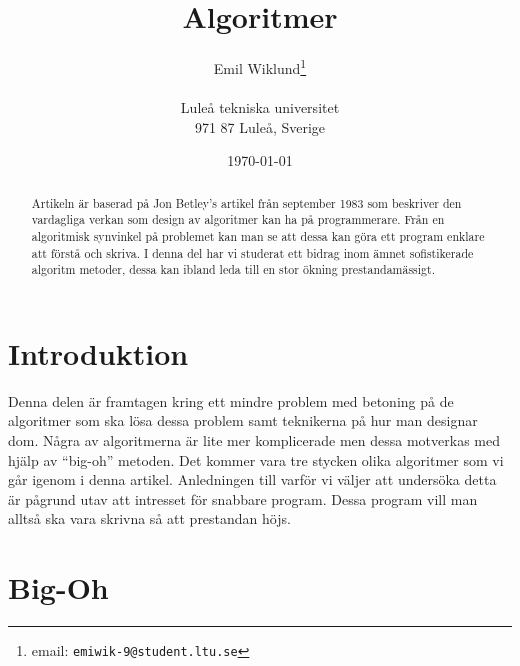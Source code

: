 \documentclass[a4paper,12pt]{article}
\title{Algoritmer}
\author{Emil Wiklund\thanks{email: \texttt{emiwik-9@student.ltu.se}}\\  
        ~ \\
        Luleå tekniska universitet \\ 
        971 87 Luleå, Sverige}
\date{\today}
\begin{document}
\linenumbers


\maketitle


\begin{abstract}
%
Artikeln är baserad på Jon Betley's artikel från september 1983 som beskriver 
den vardagliga verkan som design av algoritmer kan ha på programmerare. 
Från en algoritmisk synvinkel på problemet kan man se att dessa kan göra 
ett program enklare att förstå och skriva. I denna del har vi studerat ett 
bidrag inom ämnet sofistikerade algoritm metoder, dessa kan ibland leda till
en stor ökning prestandamässigt. 
%
\end{abstract}


\section{Introduktion}
\label{sec:introduktion}


Denna delen är framtagen kring ett mindre
problem med betoning på de algoritmer som ska lösa dessa problem samt
teknikerna på hur man designar dom. Några av algoritmerna är lite mer 
komplicerade men dessa motverkas med hjälp av “big-oh” metoden. Det
kommer vara tre stycken olika algoritmer som vi går igenom i denna artikel.
Anledningen till varför vi väljer att undersöka detta är pågrund utav att
intresset för snabbare program. Dessa program vill man alltså ska vara 
skrivna så att prestandan höjs.
%

\section{Big-Oh}
\label{sec:big-oh}
\end{document}
